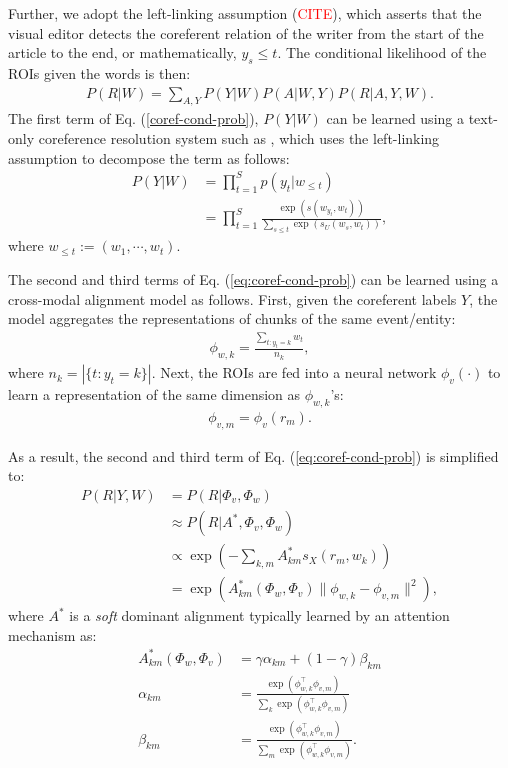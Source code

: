 \documentclass[11pt,a4paper]{article}
\begin{document}
 Further, we adopt the left-linking assumption (\textcolor{red}{CITE}), which asserts that the visual editor detects the coreferent relation of the writer from the start of the article to the end, or mathematically, $y_s \leq t$. The conditional likelihood of the ROIs given the words is then:
 \begin{align}\label{coref-cond-prob}
     P(R|W) = \sum_{A, Y} P(Y|W) P(A|W, Y) P(R|A, Y, W). 
 \end{align}
The first term of Eq. (\ref{coref-cond-prob}), $P(Y|W)$ can be learned using a text-only coreference resolution system such as \cite{Lee2017-neural-coref}, which uses the left-linking assumption to decompose the term as follows:
\begin{align}\label{left-link-coref-prob}
    P(Y|W) &= \prod_{t=1}^S p(y_t|w_{\leq t})\\
           &= \prod_{t=1}^S \frac{\exp(s(w_{y_t}, w_t))}{\sum_{s\leq t}\exp(s_U(w_{s}, w_t))},
\end{align}
where $w_{\leq t} := (w_1, \cdots, w_t)$. 

The second and third terms of Eq. (\ref{eq:coref-cond-prob}) can be learned using a cross-modal alignment model as follows. First, given the coreferent labels $Y$, the model aggregates the representations of chunks of the same event/entity:
\begin{align}\label{eq:sentence-enc}
    \phi_{w, k} = \frac{\sum_{t:y_t=k} w_{t}}{n_k}, 
\end{align}
where $n_k = |\{t:y_t=k\}|$. Next, the ROIs are fed into a neural network $\phi_v(\cdot)$ to learn a representation of the same dimension as $\phi_{w,k}$'s:
\begin{align}\label{eq:image-enc}
    \phi_{v, m} = \phi_v(r_m). 
\end{align}

As a result, the second and third term of Eq. (\ref{eq:coref-cond-prob}) is simplified to:
\begin{align}\label{eq:align-prob}
     P(R|Y, W) &= P(R|\Phi_v, \Phi_w) \\
     &\approx P(R|A^*, \Phi_v, \Phi_w)\\
     &\propto \exp\left(-\sum_{k, m}A^*_{km}s_X(r_m, w_k)\right)\\
     &= \exp\left(A^*_{km}(\Phi_w, \Phi_v) \|\phi_{w, k} -\phi_{v, m}\|^2\right),
\end{align}
where $A^*$ is a \textit{soft} dominant alignment typically learned by an attention mechanism as:
\begin{align}\label{eq:}
    A^*_{km}(\Phi_w, \Phi_v) &=  \gamma \alpha_{km} + (1-\gamma)\beta_{km}\\
    \alpha_{km} &= \frac{\exp(\phi_{w,k}^\top\phi_{v,m})}{\sum_{k}\exp(\phi_{w,k}^\top\phi_{v,m})}\\
    \beta_{km}  &= \frac{\exp(\phi_{w,k}^\top\phi_{v,m})}{\sum_{m}\exp(\phi_{w,k}^\top\phi_{v,m})}.
\end{align}
\end{document}
